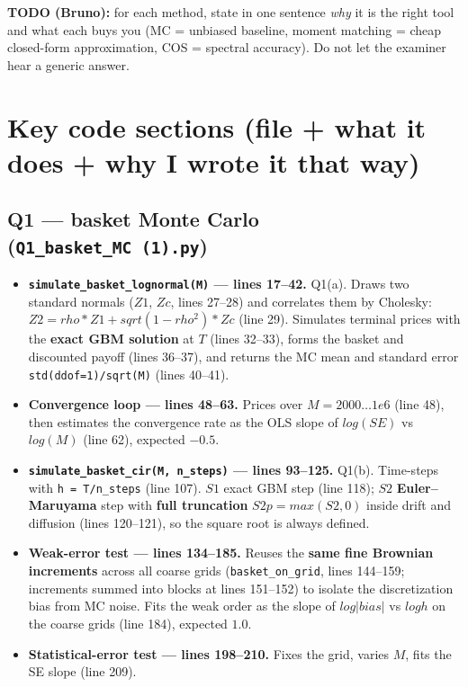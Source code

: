 \documentclass[
  11pt,
]{article}
\providecommand{\tightlist}{%
  \setlength{\itemsep}{0pt}\setlength{\parskip}{0pt}}
\begin{document}
\textbf{TODO (Bruno):} for each method, state in one sentence \emph{why}
it is the right tool and what each buys you (MC = unbiased baseline,
moment matching = cheap closed-form approximation, COS = spectral
accuracy). Do not let the examiner hear a generic answer.

\hypertarget{key-code-sections-file-what-it-does-why-i-wrote-it-that-way}{%
\section{Key code sections (file + what it does + why I wrote it that
way)}\label{key-code-sections-file-what-it-does-why-i-wrote-it-that-way}}

\hypertarget{q1-basket-monte-carlo-q1_basket_mc-1.py}{%
\subsection{\texorpdfstring{Q1 --- basket Monte Carlo
(\texttt{Q1\_basket\_MC\ (1).py})}{Q1 --- basket Monte Carlo (Q1\_basket\_MC (1).py)}}\label{q1-basket-monte-carlo-q1_basket_mc-1.py}}

\begin{itemize}
\tightlist
\item
  \textbf{\texttt{simulate\_basket\_lognormal(M)} --- lines 17--42.}
  Q1(a). Draws two standard normals (\(Z1\), \(Zc\), lines 27--28) and
  correlates them by Cholesky: \(Z2 = rho*Z1 + sqrt(1-rho^2)*Zc\) (line
  29). Simulates terminal prices with the \textbf{exact GBM solution} at
  \(T\) (lines 32--33), forms the basket and discounted payoff (lines
  36--37), and returns the MC mean and standard error
  \texttt{std(ddof=1)/sqrt(M)} (lines 40--41).
\item
  \textbf{Convergence loop --- lines 48--63.} Prices over
  \(M = 2000 … 1e6\) (line 48), then estimates the convergence rate as
  the OLS slope of \(log(SE)\) vs \(log(M)\) (line 62), expected
  \(-0.5\).
\item
  \textbf{\texttt{simulate\_basket\_cir(M,\ n\_steps)} --- lines
  93--125.} Q1(b). Time-steps with \texttt{h\ =\ T/n\_steps} (line 107).
  \(S1\) exact GBM step (line 118); \(S2\) \textbf{Euler--Maruyama} step
  with \textbf{full truncation} \(S2p = max(S2,0)\) inside drift and
  diffusion (lines 120--121), so the square root is always defined.
\item
  \textbf{Weak-error test --- lines 134--185.} Reuses the \textbf{same
  fine Brownian increments} across all coarse grids
  (\texttt{basket\_on\_grid}, lines 144--159; increments summed into
  blocks at lines 151--152) to isolate the discretization bias from MC
  noise. Fits the weak order as the slope of \(log|bias|\) vs \(log h\)
  on the coarse grids (line 184), expected \(1.0\).
\item
  \textbf{Statistical-error test --- lines 198--210.} Fixes the grid,
  varies \(M\), fits the SE slope (line 209).
\end{itemize}
\end{document}
